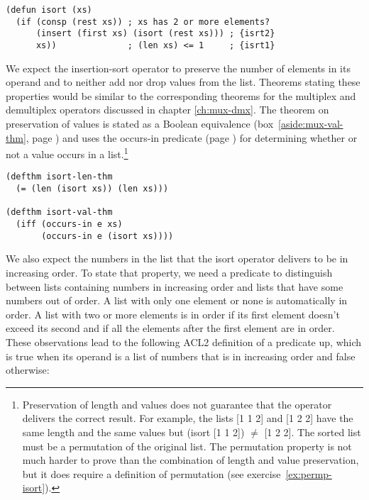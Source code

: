 \label{defun:isort}
\begin{code}
\begin{verbatim}
(defun isort (xs)
  (if (consp (rest xs)) ; xs has 2 or more elements?
      (insert (first xs) (isort (rest xs))) ; {isrt2}
      xs))              ; (len xs) <= 1     ; {isrt1}
\end{verbatim}
\end{code}

We expect the insertion-sort operator to preserve
the number of elements in its operand and to
neither add nor drop values from the list.
Theorems stating these properties would be
similar to the corresponding theorems for
the multiplex and demultiplex operators discussed
in chapter \ref{ch:mux-dmx}.
The theorem on preservation of values is
stated as a
Boolean
equivalence
(box~\ref{aside:mux-val-thm}, page \pageref{aside:mux-val-thm})
and uses the \textsf{occurs-in }predicate
(page \pageref{def:occurs-in}) for determining
whether or not a value occurs in a list.\footnote{Preservation
of length and values does not guarantee
that the operator delivers the correct result.
For example, the lists \textsf{[1 1 2]} and \textsf{[1 2 2]} have the
same length and the same values
but \textsf{(isort [1 1 2]) $\neq$ [1 2 2]}.
The sorted list must be a permutation of the original list.
The permutation property is not much harder
to prove than the combination of length and value preservation,
but it does require a definition of permutation
(see exercise~\ref{ex:permp-isort}).}

\label{defthm:isort-len}
\label{defthm:isort-val}
\begin{code}
\begin{verbatim}
(defthm isort-len-thm
  (= (len (isort xs)) (len xs)))

(defthm isort-val-thm
  (iff (occurs-in e xs)
       (occurs-in e (isort xs))))
\end{verbatim}
\end{code}

We also expect the numbers in the list
that the \textsf{isort} operator
delivers to be in increasing order.
To state that property, we need a predicate
to distinguish between lists containing numbers in increasing order
and lists that have some numbers out of order.
A list with only one element or none is automatically in order.
A list with two or more elements is in order
if its first element doesn't exceed its second and if
all the elements after the first element are in order.
These observations lead to the following
ACL2 definition of a predicate \textsf{up},
which is true when its operand is a list
of numbers that is in increasing order and false otherwise:


